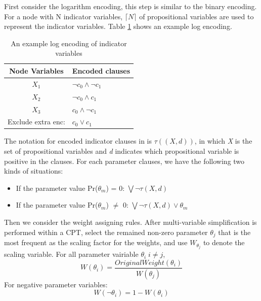         \noindent First consider the logarithm encoding, this step is similar to the binary encoding. For a node with N indicator variables, $\lceil N \rceil$ of propositional variables are used to represent the indicator variables. Table \ref{tab:log_example} shows an example log encoding.\\
        \begin{table}[]
            \centering
            \begin{tabular}{c l}
                \hline
                Node Variables	&	Encoded clauses	\\
                \hline
                \hline
                $X_{1}$	&	$\neg c_{0} \wedge \neg c_{1}$	\\
                $X_{2}$	&	$\neg c_{0} \wedge c_{1}$	\\
                $X_{3}$	&	$ c_{0} \wedge \neg c_{1}$	\\
                \hline
                Exclude extra enc: & $c_{0} \vee  c_{1}$\\
                \hline
            \end{tabular}
            \caption{An example log encoding of indicator variables}
            \label{tab:log_example}
        \end{table}
        
        \noindent The notation for encoded indicator clauses in \cite{2016-logencoding} is $\tau((X, d))$, in which \textit{X} is the set of propositional variables and \textit{d} indicates which propositional variable is positive in the clauses. For each parameter clauses, we have the following two kinds of situations:
        
        \begin{itemize}
            \item If the parameter value Pr($\theta_{m}$) = 0: $\bigvee \neg \tau(X, d)$ 
            \item If the parameter value Pr($\theta_{m}$) $\neq$ 0: $\bigvee \neg \tau(X, d) \vee \theta_{m}$ 
        \end{itemize}
        
        \noindent Then we consider the weight assigning rules. After multi-variable simplification is performed within a CPT, select the remained non-zero parameter $\theta_{j}$ that is the most frequent as the scaling factor for the weights, and use $W_{\theta_{j}}$ to denote the scaling variable. For all parameter vairiable $\theta_{i}\; i \neq j$, 
        $$W(\theta_{i}) = \frac{OriginalWeight(\theta_{i})}{W(\theta_{j})}$$
        For negative parameter variables:
        $$W(\neg \theta_{i}) = 1 - W(\theta_{i})$$


